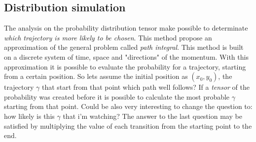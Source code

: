 \documentclass[class=article, crop=false]{standalone}
\begin{document}
\subsection{Distribution simulation}
The analysis on the probability distribution tensor make possible to determinate \emph{which trajectory is more likely to be chosen}.
This method propose an approximation of the general problem called \emph{path integral}.
This method is built on a discrete system of time, space and "directions" of the momentum.
With this approximation it is possible to evaluate the probability for a trajectory, starting from a certain position.
So lets assume the initial position as $(x_0, y_0)$, the trajectory $\gamma$ that start from that point which path well follows?
If a \emph{tensor} of the probability was created before it is possible to calculate the most probable $\gamma$ starting from that point.
Could be also very interesting to change the question to: how likely is this $\gamma$ that i'm watching?
The answer to the last question may be satisfied by multiplying the value of each transition from the starting point to the end.
\end{document}
